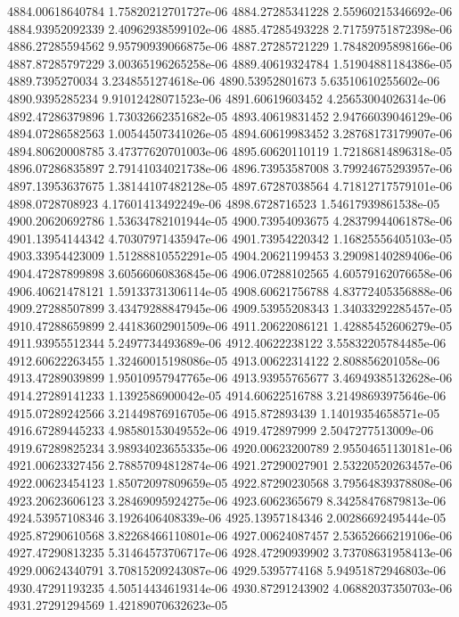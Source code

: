{4884.00618640784 1.75820212701727e-06
4884.27285341228 2.55960215346692e-06
4884.93952092339 2.40962938599102e-06
4885.47285493228 2.71759751872398e-06
4886.27285594562 9.95790939066875e-06
4887.27285721229 1.78482095898166e-06
4887.87285797229 3.00365196265258e-06
4889.40619324784 1.51904881184386e-05
4889.7395270034 3.2348551274618e-06
4890.53952801673 5.63510610255602e-06
4890.9395285234 9.91012428071523e-06
4891.60619603452 4.25653004026314e-06
4892.47286379896 1.73032662351682e-05
4893.40619831452 2.94766039046129e-06
4894.07286582563 1.00544507341026e-05
4894.60619983452 3.28768173179907e-06
4894.80620008785 3.47377620701003e-06
4895.60620110119 1.72186814896318e-05
4896.07286835897 2.79141034021738e-06
4896.73953587008 3.79924675293957e-06
4897.13953637675 1.38144107482128e-05
4897.67287038564 4.71812717579101e-06
4898.0728708923 4.17601413492249e-06
4898.6728716523 1.54617939861538e-05
4900.20620692786 1.53634782101944e-05
4900.73954093675 4.28379944061878e-06
4901.13954144342 4.70307971435947e-06
4901.73954220342 1.16825556405103e-05
4903.33954423009 1.51288810552291e-05
4904.20621199453 3.29098140289406e-06
4904.47287899898 3.60566060836845e-06
4906.07288102565 4.60579162076658e-06
4906.40621478121 1.59133731306114e-05
4908.60621756788 4.83772405356888e-06
4909.27288507899 3.43479288847945e-06
4909.53955208343 1.34033292285457e-05
4910.47288659899 2.44183602901509e-06
4911.20622086121 1.42885452606279e-05
4911.93955512344 5.2497734493689e-06
4912.40622238122 3.55832205784485e-06
4912.60622263455 1.32460015198086e-05
4913.00622314122 2.808856201058e-06
4913.47289039899 1.95010957947765e-06
4913.93955765677 3.46949385132628e-06
4914.27289141233 1.1392586900042e-05
4914.60622516788 3.21498693975646e-06
4915.07289242566 3.21449876916705e-06
4915.872893439 1.14019354658571e-05
4916.67289445233 4.98580153049552e-06
4919.472897999 2.5047277513009e-06
4919.67289825234 3.98934023655335e-06
4920.00623200789 2.95504651130181e-06
4921.00623327456 2.78857094812874e-06
4921.27290027901 2.53220520263457e-06
4922.00623454123 1.85072097809659e-05
4922.87290230568 3.79564839378808e-06
4923.20623606123 3.28469095924275e-06
4923.6062365679 8.34258476879813e-06
4924.53957108346 3.1926406408339e-06
4925.13957184346 2.00286692495444e-05
4925.87290610568 3.82268466110801e-06
4927.00624087457 2.53652666219106e-06
4927.47290813235 5.31464573706717e-06
4928.47290939902 3.73708631958413e-06
4929.00624340791 3.70815209243087e-06
4929.5395774168 5.94951872946803e-06
4930.47291193235 4.50514434619314e-06
4930.87291243902 4.06882037350703e-06
4931.27291294569 1.42189070632623e-05
}
